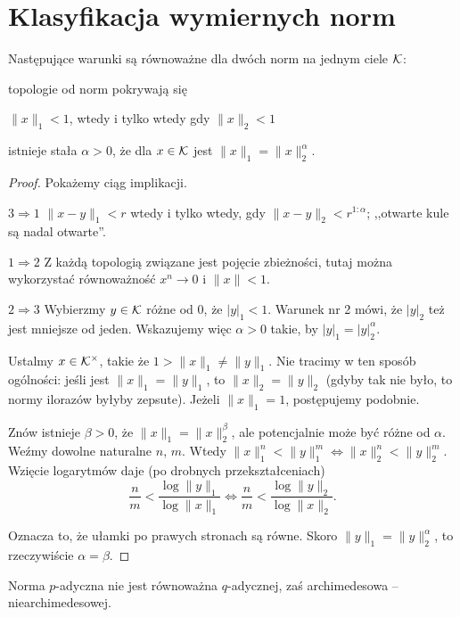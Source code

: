 \section{Klasyfikacja wymiernych norm}
\begin{lemat}
	Następujące warunki są równoważne dla dwóch norm na jednym ciele $\mathcal K$:
	\begin{enumx}
		\item topologie od norm pokrywają się
		\item $\|x\|_1 < 1$, wtedy i tylko wtedy gdy $\|x\|_2 < 1$
		\item istnieje stała $\alpha > 0$, że dla $x \in \mathcal K$ jest $\|x\|_1 = \|x\|_2^\alpha$.
	\end{enumx}
\end{lemat}

\begin{proof}
	Pokażemy ciąg implikacji.
	\begin{itemx}
		\item [$3 \Rightarrow 1$] $\|x-y\|_1 < r$ wtedy i tylko wtedy, gdy $\|x-y\|_2 < r^{1:\alpha}$; ,,otwarte kule są nadal otwarte''. 
		\item [$1 \Rightarrow 2$] Z każdą topologią związane jest pojęcie zbieżności, tutaj można wykorzystać równoważność $x^n \to 0$ i $\|x\| < 1$.
		\item [$2 \Rightarrow 3$] 	Wybierzmy $y \in \mathcal K$ różne od $0$, że $|y|_1 < 1$.
	Warunek nr 2 mówi, że $|y|_2$ też jest mniejsze od jeden.
	Wskazujemy więc $\alpha > 0$ takie, by $|y|_1 = |y|_2^\alpha$.
	\end{itemx}

	Ustalmy $x \in \mathcal K^\times$, takie że $1 > \|x\|_1 \neq \|y\|_1$.
	Nie tracimy w ten sposób ogólności: jeśli jest $\|x\|_1 = \|y\|_1$, to $\|x\|_2 = \|y\|_2$ (gdyby tak nie było, to normy ilorazów byłyby zepsute).
	Jeżeli $\|x\|_1 = 1$, postępujemy podobnie.

	Znów istnieje $\beta > 0$, że $\|x\|_1 = \|x\|_2^\beta$, ale potencjalnie może być różne od $\alpha$.
	Weźmy dowolne naturalne $n$, $m$.
	Wtedy $\|x\|_1^n < \|y\|_1^m \iff \|x\|_2^n < \|y\|_2^m$.
	Wzięcie logarytmów daje (po drobnych przekształceniach)
	\[
		\frac nm < \frac{\log \|y\|_1}{\log \|x\|_1} \iff \frac n m < \frac{\log \|y\|_2}{\log \|x\|_2}.
	\]

	Oznacza to, że ułamki po prawych stronach są równe.
	Skoro $\|y\|_1 = \|y\|_2^\alpha$, to rzeczywiście $\alpha = \beta$.
\end{proof}

\begin{wniosek}
	Norma $p$-adyczna nie jest równoważna $q$-adycznej, zaś archimedesowa -- niearchimedesowej.
\end{wniosek}

